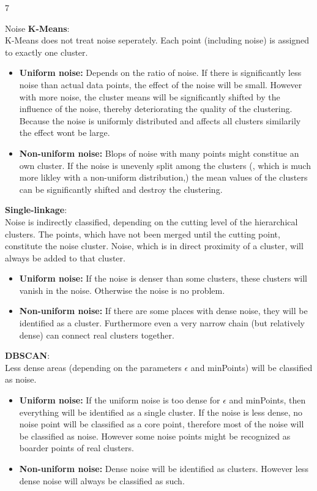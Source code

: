 \documentclass{article}
\begin{document}
\begin{ukon-infie}[12.12.17]{7}
\begin{exercise}[p=3]{Noise}
			\textbf{K-Means}:\\
			K-Means does not treat noise seperately. Each point (including noise) is assigned to exactly one cluster.\\
				\begin{itemize}
				 \item \textbf{Uniform noise:} Depends on the ratio of noise. If there is significantly less noise than actual data points, the effect of the noise will be small. However with more noise, the cluster means will be significantly shifted by the influence of the noise, thereby deteriorating the quality of the clustering. Because the noise is uniformly distributed and affects all clusters similarily the effect wont be large.
				 \item \textbf{Non-uniform noise:} Blops of noise with many points might constitue an own cluster. If the noise is unevenly split among the clusters (, which is much more likley with a non-uniform distribution,) the mean values of the clusters can be significantly shifted and destroy the clustering.
				\end{itemize}
				
				
				\bigskip
						
			\textbf{Single-linkage}:\\
			Noise is indirectly classified, depending on the cutting level of the hierarchical clusters. The points, which have not been merged until the cutting point, constitute the noise cluster. Noise, which is in direct proximity of a cluster, will always be added to that cluster.
			\begin{itemize}
				 \item \textbf{Uniform noise:} If the noise is denser than some clusters, these clusters will vanish in the noise. Otherwise the noise is no problem.
				 \item \textbf{Non-uniform noise:} If there are some places with dense noise, they will be identified as a cluster. Furthermore even a very narrow chain (but relatively dense) can connect real clusters together.
			\end{itemize}
			
			\textbf{DBSCAN}:\\
			Less dense areas (depending on the parameters $\epsilon$ and minPoints) will be classified as noise.\\
			\begin{itemize}
				 \item \textbf{Uniform noise:} If the uniform noise is too dense for $\epsilon$ and minPoints, then everything will be identified as a single cluster. If the noise is less dense, no noise point will be classified as a core point, therefore most of the noise will be classified as noise. However some noise points might be recognized as boarder points of real clusters.
				 \item \textbf{Non-uniform noise:} Dense noise will be identified as clusters. However less dense noise will always be classified as such.
			\end{itemize}
			

\end{exercise}
\end{ukon-infie}
\end{document}
